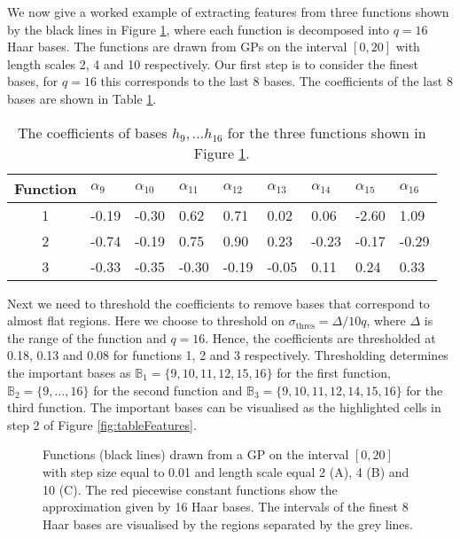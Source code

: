\documentclass[../main.tex]{subfiles}
\begin{document}
 
 We now give a worked example of extracting features from three functions shown by the black lines in Figure \ref{fig:Extractfeature}, where each function is decomposed into $q = 16$ Haar bases. The functions are drawn from GPs on the interval $[0,20]$ with length scales 2, 4 and 10 respectively. Our first step is to consider the finest bases, for $q=16$ this corresponds to the last 8 bases. The coefficients of the last 8 bases are shown in Table \ref{table:Haar_Features}. 

\begin{table}[h!]
  \begin{center}
    \begin{tabular}{|c|l|l|l|l|l|l|l|l|}
    \hline
      \textbf{Function} & $\alpha_{9}$ & $\alpha_{10}$ & $\alpha_{11}$  & $\alpha_{12}$ & $\alpha_{13}$ & $\alpha_{14}$ & $\alpha_{15}$ & $\alpha_{16}$  \\ 
      \hline
      1 &-0.19 &-0.30&  0.62&  0.71 & 0.02&  0.06& -2.60 & 1.09  \\
 	  2 & -0.74 &-0.19  &0.75  &0.90 & 0.23 &-0.23 &-0.17 &-0.29\\
 	  3 &  -0.33 &-0.35& -0.30& -0.19& -0.05&  0.11 & 0.24 & 0.33\\ \hline
    \end{tabular}
  \end{center}
    \caption{The coefficients of bases $h_9, \dots h_{16}$ for the three functions shown in Figure \ref{fig:Extractfeature}. }
     \label{table:Haar_Features}
\end{table} 
  
  Next we need to threshold the coefficients to remove bases that correspond to almost flat regions. Here we choose to threshold  on $\sigma_{\mathrm{thres}} = \Delta/10q$, where $\Delta$ is the range of the function and $q=16$. Hence, the coefficients are thresholded at  0.18, 0.13 and 0.08 for functions 1, 2 and 3 respectively. Thresholding determines the important bases as $\mathbb{B}_1 = \{9,10,11,12,15,16\}$ for the first function, $\mathbb{B}_2 = \{9, \dots, 16\}$ for the second function and $\mathbb{B}_3 = \{9,10,11,12,14,15,16\}$ for the third function. The important bases can be visualised as the highlighted cells in step 2 of Figure \ref{fig:tableFeatures}.
  
    \begin{figure}[t!]
   \hrulefill
   \begin{center} 
     \quad
       \vspace{0.1mm} 
   \quad
    \end{center}     
    \caption{ Functions (black lines) drawn from a GP on the interval $[0,20]$ with step size equal to 0.01 and length scale equal 2 (A), 4 (B) and 10 (C). The red piecewise constant functions show the approximation given by 16 Haar bases. The intervals of the finest 8 Haar bases are visualised by the regions separated by the grey lines. }
    \label{fig:Extractfeature}
    \hrulefill
    \end{figure}
    
\end{document}
